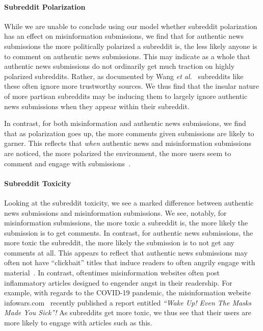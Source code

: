 \paragraph{Subreddit Polarization} While we are unable to conclude using our model whether subreddit polarization has an effect on misinformation submissions, we find that for authentic news submissions the more politically polarized a subreddit is, the less likely anyone is to comment on authentic news submissions. This may indicate as a whole that authentic news submissions do not ordinarily get much traction on highly polarized subreddits. Rather, as documented by Wang \textit{et al.}~\cite{wang2021multi} subreddits like these often ignore more trustworthy sources. We thus find that the insular nature of more partisan subreddits may be inducing them to largely ignore authentic news submissions when they appear within their subreddit.
 
In contrast, for both misinformation and authentic news submissions, we find that as polarization goes up, the more comments given submissions are likely to garner. This reflects that \emph{when} authentic news and misinformation submissions are noticed, the more polarized the environment, the more users seem to comment and engage with submissions~\cite{kim2021distorting}.
 
\paragraph{Subreddit Toxicity}
Looking at the subreddit toxicity, we see a marked difference between authentic news submissions and misinformation submissions. We see, notably, for misinformation submissions, the more toxic a subreddit is, the more likely the submission is to get comments. In contrast, for authentic news submissions, the more toxic the subreddit, the more likely the submission is to not get any comments at all. This appears to reflect that authentic news submissions may often not have ``clickbait'' titles that induce readers to often angrily engage with  material~\cite{chen2015misleading,potthast2016clickbait}. In contrast, oftentimes misinformation websites often post inflammatory articles designed to engender angst in their readership. For example, with regards to the COVID-19 pandemic, the misinformation website infowars.com~\cite{starbird2018ecosystem}  recently published a report entitled \textit{``Wake Up! Even The Masks Made You Sick''!} As subreddits get more toxic, we thus see that their users are more likely to engage with articles such as this. 
 
